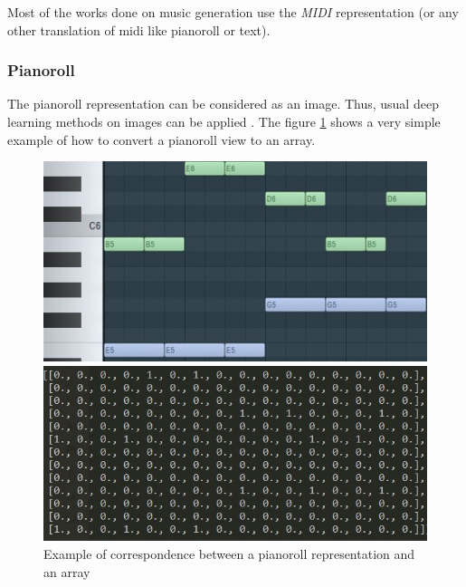 \documentclass[12pt]{report}
\begin{document}
Most of the works done on music generation use the \textit{MIDI} representation (or any other translation of midi like pianoroll or text). \cite{chuan_modeling_nodate, hadjeres_deepbach:_2016, huang_counterpoint_2017, liang_automatic_2017, adiloglu_machine_2007, herremans_composing_2013, herremans_modeling_2017, boulanger-lewandowski_modeling_2012, lattner_imposing_2018, colombo_learning_2019, brunner_symbolic_2018, wu_hierarchical_2018}

\subsubsection{Pianoroll}
\label{sec:rw:pianoroll}

The pianoroll representation can be considered as an image.
Thus, usual deep learning methods on images can  be applied \cite{huang_counterpoint_2017, chuan_modeling_nodate, boulanger-lewandowski_modeling_2012, lattner_imposing_2018, donahue_adversarial_2019}.
The figure \ref{fig:pianoroll_to_array} shows a very simple example of how to convert a pianoroll view to an array.

\begin{figure}[H]
   \begin{minipage}{0.5\textwidth}
     \centering
     \includegraphics[width=.9\linewidth]{images/music/pianoroll/pianoroll_small.jpg}
   \end{minipage}\hfill
   \begin{minipage}{0.5\textwidth}
     \centering
     \includegraphics[width=\linewidth]{images/music/pianoroll/pianoroll_small_array.jpg}
   \end{minipage}
 \caption{Example of correspondence between a pianoroll representation and an array}
 \label{fig:pianoroll_to_array}
\end{figure}
\end{document}

